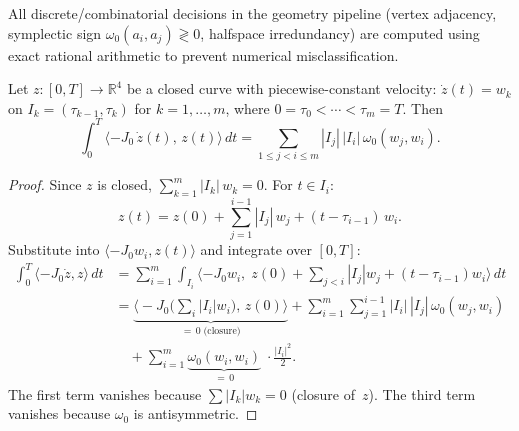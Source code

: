 \begin{unverified}
\begin{lemma}\label{lem:rational-pipeline}
All discrete/combinatorial decisions in the geometry pipeline
(vertex adjacency, symplectic sign $\omega_0(a_i, a_j) \gtrless 0$,
halfspace irredundancy) are computed using exact rational arithmetic
to prevent numerical misclassification.
\end{lemma}
\end{unverified}



\begin{lemma}\label{lem:shoelace}
Let $z \colon [0, T] \to \mathbb{R}^4$ be a closed curve with
piecewise-constant velocity:
$\dot{z}(t) = w_k$ on $I_k = (\tau_{k-1}, \tau_k)$ for
$k = 1, \ldots, m$, where $0 = \tau_0 < \cdots < \tau_m = T$.
Then
\[
  \int_0^T \langle -J_0\, \dot{z}(t),\, z(t) \rangle \, dt
  = \sum_{1 \leq j < i \leq m}
    |I_j|\, |I_i|\, \omega_0(w_j, w_i).
\]
\end{lemma}

\begin{proof}
Since $z$ is closed, $\sum_{k=1}^m |I_k|\, w_k = 0$.
For $t \in I_i$:
\[
  z(t) = z(0) + \sum_{j=1}^{i-1} |I_j|\, w_j
    + (t - \tau_{i-1})\, w_i.
\]
Substitute into
$\langle -J_0 w_i, z(t) \rangle$ and integrate over $[0, T]$:
\begin{align*}
\int_0^T \!\langle{-}J_0 \dot{z}, z \rangle \, dt
  &= \sum_{i=1}^m \int_{I_i}
    \!\langle -J_0 w_i,\;
      z(0) + \textstyle\sum_{j < i} |I_j| w_j
      + (t{-}\tau_{i-1}) w_i
    \rangle\, dt \\
  &= \underbrace{
      \bigl\langle -J_0 \bigl(\textstyle\sum_i |I_i| w_i\bigr),\,
      z(0) \bigr\rangle
    }_{= \, 0 \;\text{(closure)}}
  + \sum_{i=1}^m \sum_{j=1}^{i-1}
      |I_i|\, |I_j|\, \omega_0(w_j, w_i) \\
  &\quad
  + \sum_{i=1}^m
      \underbrace{\omega_0(w_i, w_i)}_{= \, 0}\;
      \cdot \tfrac{|I_i|^2}{2}.
\end{align*}
The first term vanishes because
$\sum |I_k| w_k = 0$ (closure of~$z$).
The third term vanishes because
$\omega_0$ is antisymmetric.
\end{proof}



